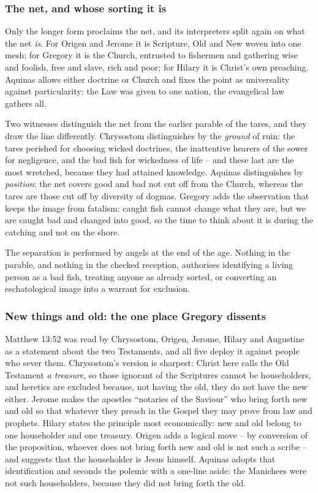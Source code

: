 \subsubsection*{The net, and whose sorting it is}

Only the longer form proclaims the net, and its interpreters split again on what the net \emph{is}. For Origen and Jerome it is Scripture, Old and New woven into one mesh; for Gregory it is the Church, entrusted to fishermen and gathering wise and foolish, free and slave, rich and poor; for Hilary it is Christ's own preaching. Aquinas allows either doctrine or Church and fixes the point as universality against particularity: the Law was given to one nation, the evangelical law gathers all.

Two witnesses distinguish the net from the earlier parable of the tares, and they draw the line differently. Chrysostom distinguishes by the \emph{ground} of ruin: the tares perished for choosing wicked doctrines, the inattentive hearers of the sower for negligence, and the bad fish for wickedness of life -- and these last are the most wretched, because they had attained knowledge. Aquinas distinguishes by \emph{position}: the net covers good and bad not cut off from the Church, whereas the tares are those cut off by diversity of dogmas. Gregory adds the observation that keeps the image from fatalism: caught fish cannot change what they are, but we are caught bad and changed into good, so the time to think about it is during the catching and not on the shore.

The separation is performed by angels at the end of the age. Nothing in the parable, and nothing in the checked reception, authorises identifying a living person as a bad fish, treating anyone as already sorted, or converting an eschatological image into a warrant for exclusion.

\subsubsection*{New things and old: the one place Gregory dissents}

Matthew 13:52 was read by Chrysostom, Origen, Jerome, Hilary and Augustine as a statement about the two Testaments, and all five deploy it against people who sever them. Chrysostom's version is sharpest: Christ here calls the Old Testament \emph{a treasure}, so those ignorant of the Scriptures cannot be householders, and heretics are excluded because, not having the old, they do not have the new either. Jerome makes the apostles ``notaries of the Saviour'' who bring forth new and old so that whatever they preach in the Gospel they may prove from law and prophets. Hilary states the principle most economically: new and old belong to one householder and one treasury. Origen adds a logical move -- by conversion of the proposition, whoever does not bring forth new and old is not such a scribe -- and suggests that the householder is Jesus himself. Aquinas adopts that identification and seconds the polemic with a one-line aside: the Manichees were not such householders, because they did not bring forth the old.

